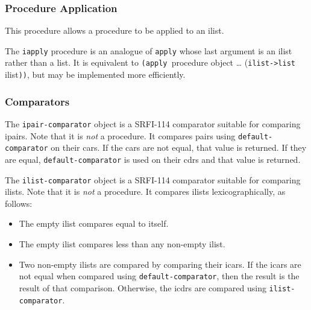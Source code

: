 \subsubsection{{Procedure Application}}\label{procedure-application}

This procedure allows a procedure to be applied to an ilist.

\begin{entry}{%
  }

  The \texttt{iapply} procedure is an analogue of
  \texttt{apply} whose last argument is an ilist rather than a
  list. It is equivalent to \texttt{(apply\ }procedure object \ldots{}
  (\texttt{ilist-\textgreater{}list} ilist\texttt{))}, but may be
  implemented more efficiently.
\end{entry}

\subsubsection{{Comparators}}\label{comparators}

\begin{entry}{%
  }

  The \texttt{ipair-comparator}
  object is a SRFI-114 comparator suitable for comparing ipairs. Note
  that it is \emph{not} a procedure. It compares pairs using
  \texttt{default-comparator} on their cars. If the cars are not
  equal, that value is returned. If they are equal,
  \texttt{default-comparator} is used on their cdrs and that value is
  returned.
\end{entry}

\begin{entry}{%
  }
 
  The \texttt{ilist-comparator}
  object is a SRFI-114 comparator suitable for comparing ilists. Note
  that it is \emph{not} a procedure. It compares ilists
  lexicographically, as follows:

\begin{itemize}
  \tightlist
\item The empty ilist compares equal to itself.
\item The empty ilist compares less than any non-empty ilist.
\item Two non-empty ilists are compared by comparing their icars. If
  the icars are not equal when compared using
  \texttt{default-comparator}, then the result is the result of that
  comparison. Otherwise, the icdrs are compared using
  \texttt{ilist-comparator}.
\end{itemize}
\end{entry}

